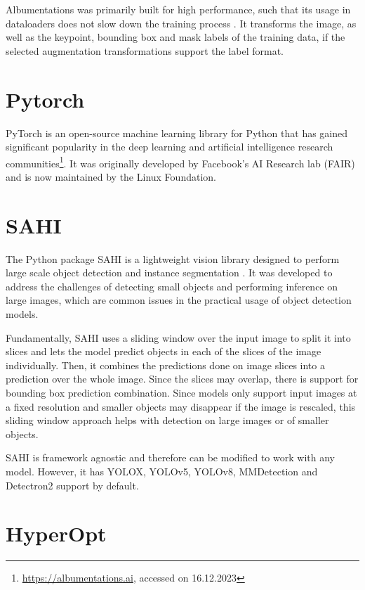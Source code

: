\documentclass[10pt]{book}
\begin{document}
Albumentations was primarily built for high performance, such that its usage in dataloaders does not slow down the training process \cite{info11020125}. It transforms the image, as well as the keypoint, bounding box and mask labels of the training data, if the selected augmentation transformations support the label format. 

\section{Pytorch}

PyTorch is an open-source machine learning library for Python that has gained significant popularity in the deep learning and artificial intelligence research communities\footnote{\url{https://albumentations.ai}, accessed on 16.12.2023}. It was originally developed by Facebook's AI Research lab (FAIR) and is now maintained by the Linux Foundation. %

\section{SAHI}

The Python package \ac{SAHI} is a lightweight vision library designed to perform large scale object detection and instance segmentation \cite{akyon2022sahi,obss2021sahi}. It was developed to address the challenges of detecting small objects and performing inference on large images, which are common issues in the practical usage of object detection models. 

Fundamentally, \ac{SAHI} uses a sliding window over the input image to split it into slices and lets the model predict objects in each of the slices of the image individually. Then, it combines the predictions done on image slices into a prediction over the whole image. Since the slices may overlap, there is support for bounding box prediction combination. Since models only support input images at a fixed resolution and smaller objects may disappear if the image is rescaled, this sliding window approach helps with detection on large images or of smaller objects.

\ac{SAHI} is framework agnostic and therefore can be modified to work with any model. However, it has \ac{YOLO}X, \ac{YOLO}v5, \ac{YOLO}v8, MMDetection and Detectron2 support by default.

\section{HyperOpt}
\end{document}
